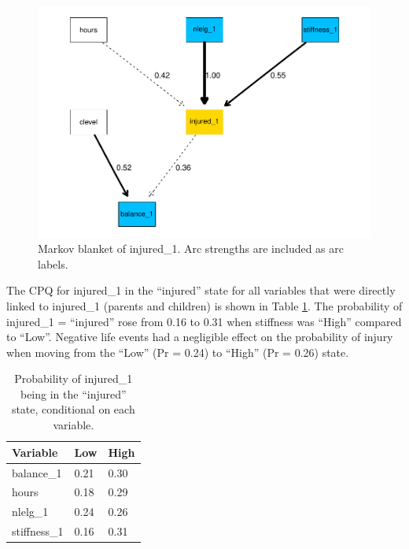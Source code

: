 \documentclass[
  english,
  man,floatsintext]{apa6}
\begin{document}
\begin{figure}
\centering
\includegraphics{figs/study1figs/node1-1.pdf}
\caption{\label{fig:node1}Markov blanket of injured\_1. Arc strengths are included as arc labels.}
\end{figure}

The CPQ for injured\_1 in the \enquote{injured} state for all variables that were directly linked to injured\_1 (parents and children) is shown in Table \ref{tab:query1}.
The probability of injured\_1 = \enquote{injured} rose from 0.16 to 0.31 when stiffness was \enquote{High} compared to \enquote{Low}.
Negative life events had a negligible effect on the probability of injury when moving from the \enquote{Low} (Pr = 0.24) to \enquote{High} (Pr = 0.26) state.

\begin{table}[H]

\begin{center}
\begin{threeparttable}

\caption{\label{tab:query1}Probability of injured\_1 being in the ``injured'' state, conditional on each variable.}

\begin{tabular}{lll}
\toprule
Variable & Low & High\\
\midrule
balance\_1 & 0.21 & 0.30\\
hours & 0.18 & 0.29\\
nlelg\_1 & 0.24 & 0.26\\
stiffness\_1 & 0.16 & 0.31\\
\bottomrule
\end{tabular}

\end{threeparttable}
\end{center}

\end{table}
\end{document}

